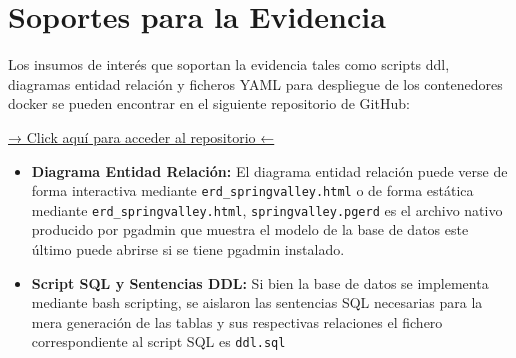 \section{Soportes para la Evidencia}
Los insumos de interés que soportan la evidencia tales como scripts ddl, diagramas entidad relación y ficheros YAML para despliegue de los contenedores docker se pueden encontrar en el siguiente repositorio de GitHub:

\vspace{0.5cm}
\begin{center}
	\href{https://github.com/jota2209/GA4-210602033-AA1-EV03}{→ Click aquí para acceder al repositorio ←}
	
\end{center}
\vspace{0.5cm}

\begin{itemize}
	\item \textbf{Diagrama Entidad Relación:} El diagrama entidad relación puede verse de forma interactiva mediante \texttt{erd\_springvalley.html} o de forma estática mediante \texttt{erd\_\allowbreak springvalley.html}, \texttt{springvalley.pgerd} es el archivo nativo producido por pgadmin que muestra el modelo de la base de datos este último puede abrirse si se tiene pgadmin instalado.
	
	\item \textbf{Script SQL y Sentencias DDL:} Si bien la base de datos se implementa mediante bash scripting, se aislaron las sentencias SQL necesarias para la mera generación de las tablas y sus respectivas relaciones el fichero correspondiente al script SQL es \texttt{ddl.sql}
\end{itemize}



